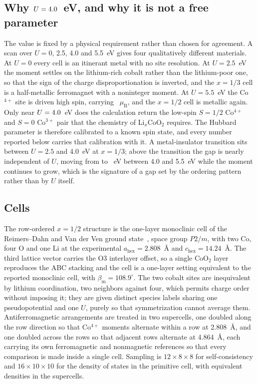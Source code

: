 \documentclass[reprint,twocolumn,prb,amsmath,amssymb,superscriptaddress,floatfix]{revtex4-2}
\newcommand{\muBs}{\mu_{\mathrm{B}}}
\begin{document}
\subsection{Why $U=4.0$~eV, and why it is not a free parameter}

The value is fixed by a physical requirement rather than chosen for agreement. A scan over
$U=0$, 2.5, 4.0 and 5.5~eV gives four qualitatively different materials. At $U=0$ every cell is
an itinerant metal with no site resolution. At $U=2.5$~eV the moment settles on the lithium-rich
cobalt rather than the lithium-poor one, so that the sign of the charge disproportionation is
inverted, and the $x=1/3$ cell is a half-metallic ferromagnet with a noninteger moment. At
$U=5.5$~eV the Co$^{4+}$ site is driven high spin, carrying \comomentHighU~$\muBs$, and the
$x=1/2$ cell is metallic again. Only near $U=4.0$~eV does the calculation return the low-spin
$S=1/2$ Co$^{4+}$ and $S=0$ Co$^{3+}$ pair that the chemistry of Li$_x$CoO$_2$ requires. The
Hubbard parameter is therefore calibrated to a known spin state, and every number reported below
carries that calibration with it. A metal-insulator transition sits between $U=2.5$ and 4.0~eV at
$x=1/3$; above the transition the gap is nearly independent of $U$, moving from \gapXthirdUfour{} to
\gapXthirdUfive~eV between 4.0 and 5.5~eV while the moment continues to grow, which is the signature of a
gap set by the ordering pattern rather than by $U$ itself.

\subsection{Cells}

The row-ordered $x=1/2$ structure is the one-layer monoclinic cell of the Reimers--Dahn and Van
der Ven ground state~\cite{Reimers1992,VanderVen1998}, space group $P2/m$, with two Co, four O
and one Li at the experimental $a_{\mathrm{hex}}=2.808$~\AA{} and $c_{\mathrm{hex}}=14.24$~\AA.
The third lattice vector carries the O3 interlayer offset, so a single CoO$_2$ layer reproduces
the ABC stacking and the cell is a one-layer setting equivalent to the reported monoclinic cell,
with $\beta_{\mathrm{m}}=108.9^{\circ}$. The two cobalt sites are inequivalent by lithium
coordination, two neighbors against four, which permits charge order without imposing it; they are given distinct
species labels sharing one pseudopotential and one $U$, purely so that symmetrization cannot
average them. Antiferromagnetic arrangements are treated in two supercells, one doubled along
the row direction so that Co$^{4+}$ moments alternate within a row at 2.808~\AA, and one doubled
across the rows so that adjacent rows alternate at 4.864~\AA, each carrying its own ferromagnetic
and nonmagnetic references so that every comparison is made inside a single cell. Sampling is
$12\times8\times8$ for self-consistency and $16\times10\times10$ for the density of states in
the primitive cell, with equivalent densities in the supercells.
\end{document}
